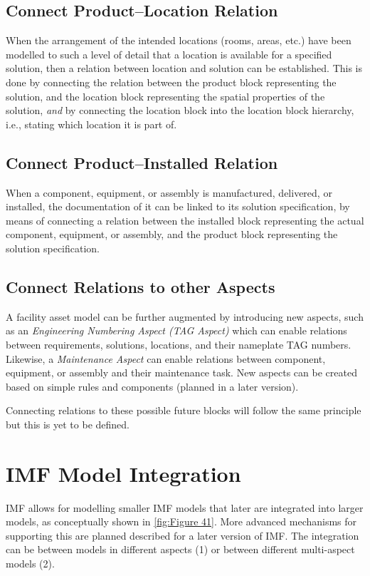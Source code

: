 \documentclass[../main.tex]{subfiles}
\begin{document}
\subsection{Connect Product--Location Relation}
When the arrangement of the intended locations (rooms, areas, etc.) have been modelled to
such a level of detail that a location is available for a specified solution, then a relation between location and
solution can be established. This is done by connecting the relation between the product block representing
the solution, and the location block representing the spatial properties of the solution, \emph{and} by
connecting the location block into the location block hierarchy, i.e., stating which location it is part of.

\subsection{Connect Product--Installed Relation}
When a component, equipment, or assembly is manufactured, delivered, or installed, the
documentation of it can be linked to its solution specification, by means of connecting a relation between the
installed block representing the actual component, equipment, or assembly, and the product block
representing the solution specification.

\subsection{Connect Relations to other Aspects}
A facility asset model can be further augmented by introducing new aspects, such as an
\emph{Engineering Numbering Aspect (TAG Aspect)} which can enable relations between requirements, solutions, locations, and
their nameplate TAG numbers. Likewise, a \emph{Maintenance Aspect} can enable relations between component, equipment, or
assembly and their maintenance task. New aspects can be created based on simple rules and components (planned in a
later version).

Connecting relations to these possible future blocks will follow the same principle but this is yet to be defined.

\section{IMF Model Integration}
IMF allows for modelling smaller IMF models that later are integrated into larger models,
as conceptually shown in \autoref{fig:Figure 41}. More advanced mechanisms for supporting this are planned described for a later version of
IMF. The integration can be between models in different aspects (1) or between different multi-aspect models (2).
\end{document}
